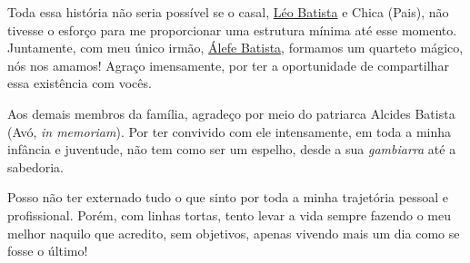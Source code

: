 \documentclass[
]{article}
\begin{document}
Toda essa história não seria possível se o casal,
\href{https://www.facebook.com/josealcigeriobatista.alcigerio}{Léo
Batista} e Chica (Pais), não tivesse o esforço para me proporcionar uma
estrutura mínima até esse momento. Juntamente, com meu único irmão,
\href{https://www.instagram.com/alefebatistareal/}{Álefe Batista},
formamos um quarteto mágico, nós nos amamos! Agraço imensamente, por ter
a oportunidade de compartilhar essa existência com vocês.

Aos demais membros da família, agradeço por meio do patriarca Alcides
Batista (Avó, \emph{in memoriam}). Por ter convivido com ele
intensamente, em toda a minha infância e juventude, não tem como ser um
espelho, desde a sua \emph{gambiarra} até a sabedoria.

Posso não ter externado tudo o que sinto por toda a minha trajetória
pessoal e profissional. Porém, com linhas tortas, tento levar a vida
sempre fazendo o meu melhor naquilo que acredito, sem objetivos, apenas
vivendo mais um dia como se fosse o último!
\end{document}

